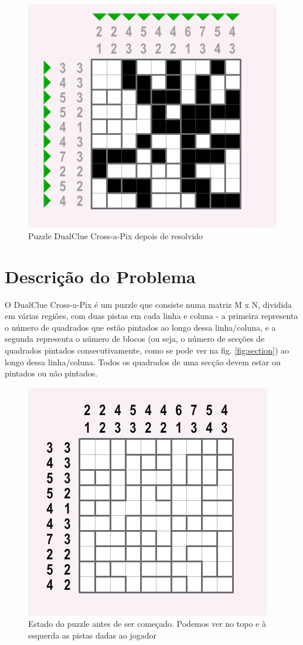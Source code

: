 \documentclass[runningheads,a4paper]{llncs}
\begin{document}
\begin{figure}[h]
\centering
\includegraphics[scale=0.5]{res/puzzlesolved.png}
\caption{Puzzle DualClue Cross-a-Pix depois de resolvido}
\label{fig:emptypuzzle}
\end{figure}

\section{Descrição do Problema}

O DualClue Cross-a-Pix é um puzzle que consiste numa matriz M x N, dividida em várias regiões, com duas pistas em cada linha e coluna - a primeira representa o número de quadrados que estão pintados ao longo dessa linha/coluna, e a segunda representa o número de blocos (ou seja, o número de secções de quadrados pintados consecutivamente, como se pode ver na fig. \ref{fig:section}) ao longo dessa linha/coluna. Todos os quadrados de uma secção devem estar ou pintados ou não pintados.

\begin{figure}[h]
\centering
\includegraphics[scale=0.5]{res/emptypuzzle.png}
\caption{Estado do puzzle antes de ser começado. Podemos ver no topo e à esquerda as pistas dadas ao jogador}
\label{fig:emptypuzzle}
\end{figure}
\end{document}
